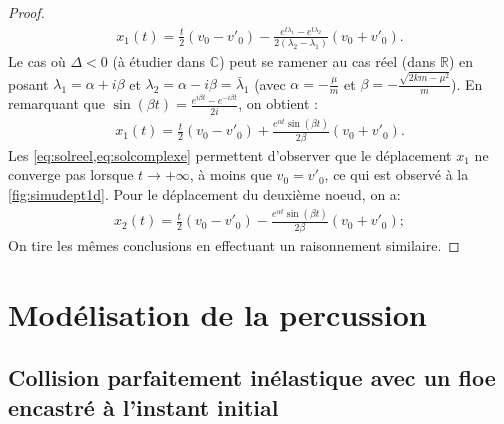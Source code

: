 \begin{proof}
\begin{align} \label{eq:solreel}
    x_1(t) = \frac{t}{2}\left( v_0 - v'_0 \right) - \frac{e^{t\lambda_1} - e^{t\lambda_2}}{2(\lambda_2 - \lambda_1)}\left( v_0 + v'_0 \right).
\end{align}
Le cas où $\Delta < 0$ (à étudier dans $\mathbb{C}$) peut se ramener au cas réel (dans $\mathbb{R}$) en posant $\lambda_1 = \alpha + i \beta$ et $\lambda_2 = \alpha - i \beta = \bar{\lambda}_1$ (avec $\alpha = -\frac{\mu}{m}$ et $\beta = -\frac{\sqrt{2km - \mu^2}}{m}$). En remarquant que $\sin(\beta t) = \frac{e^{i\beta t} - e^{-i\beta t}}{2i}$, on obtient :
\begin{align} \label{eq:solcomplexe}
    x_1(t) = \frac{t}{2}\left( v_0 - v'_0 \right) + \frac{e^{\alpha t} \sin(\beta t)}{2\beta} \left( v_0 + v'_0 \right).
\end{align}
Les \cref{eq:solreel,eq:solcomplexe} permettent d'observer que le déplacement $x_1$ ne converge pas lorsque $t \rightarrow +\infty$, à moins que $v_0 = v'_0$, ce qui est observé à la \cref{fig:simudept1d}. Pour le déplacement du deuxième noeud, on a:
\begin{align} \label{eq:solcomplexe}
    x_2(t) = \frac{t}{2}\left( v_0 - v'_0 \right) - \frac{e^{\alpha t} \sin(\beta t)}{2\beta} \left( v_0 + v'_0 \right);
\end{align}
On tire les mêmes conclusions en effectuant un raisonnement similaire.

\end{proof}













\section{Modélisation de la percussion}









\subsection{Collision parfaitement inélastique avec un floe encastré à l'instant initial}



